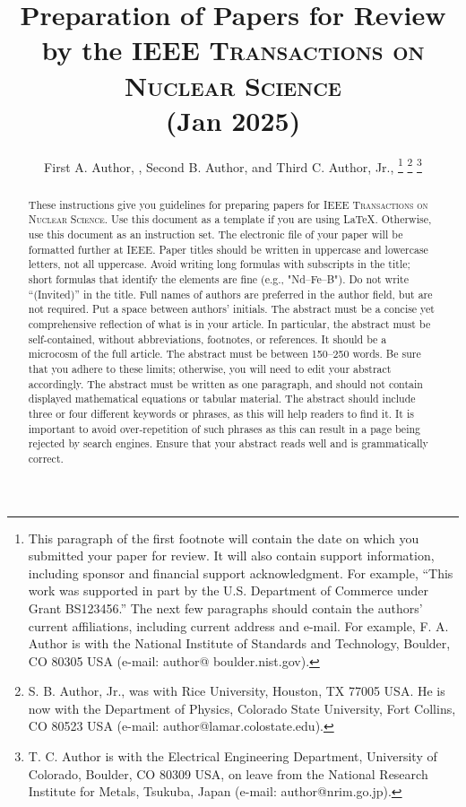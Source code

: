\documentclass{IEEEtran}
\begin{document}
\title{Preparation of Papers for Review by the \textsc{IEEE Transactions on Nuclear
Science} \\ (Jan 2025)}
\author{First A. Author, , Second B. Author, and Third C. Author, Jr., 
\thanks{This paragraph of the first footnote will contain the
date on which you submitted your paper for review. It will also contain
support information, including sponsor and financial support acknowledgment.
For example, ``This work was supported in part by the U.S. Department of
Commerce under Grant BS123456.'' The next few paragraphs should contain the
authors' current affiliations, including current address and e-mail. For
example, F. A. Author is with the National Institute of Standards and
Technology, Boulder, CO 80305 USA (e-mail: author@ boulder.nist.gov).}
\thanks{S. B. Author, Jr., was with Rice University, Houston, TX 77005 USA. He is
now with the Department of Physics, Colorado State University, Fort Collins,
CO 80523 USA (e-mail: author@lamar.colostate.edu).}
\thanks{T. C. Author is with
the Electrical Engineering Department, University of Colorado, Boulder, CO
80309 USA, on leave from the National Research Institute for Metals,
Tsukuba, Japan (e-mail: author@nrim.go.jp).}}

\maketitle

\begin{abstract}
These instructions give you guidelines
for preparing papers for \textsc{IEEE Transactions on Nuclear
Science}. Use this document as a template if you
are using \LaTeX. Otherwise, use this
document as an instruction set. The electronic file of your paper will be
formatted further at IEEE. Paper titles should be written in uppercase and
lowercase letters, not all uppercase. Avoid writing long formulas with
subscripts in the title; short formulas that identify the elements are fine
(e.g., "Nd--Fe--B"). Do not write ``(Invited)'' in the title. Full names of
authors are preferred in the author field, but are not required. Put a space
between authors' initials. The abstract must be a concise yet
comprehensive reflection of what is in your article. In particular, the
abstract must be self-contained, without abbreviations, footnotes, or
references. It should be a microcosm of the full article. The abstract must
be between 150--250 words. Be sure that you adhere to these limits;
otherwise, you will need to edit your abstract accordingly. The abstract
must be written as one paragraph, and should not contain displayed
mathematical equations or tabular material. The abstract should include
three or four different keywords or phrases, as this will help readers to
find it. It is important to avoid over-repetition of such phrases as this
can result in a page being rejected by search engines. Ensure that your
abstract reads well and is grammatically correct.
\end{abstract}
\end{document}
